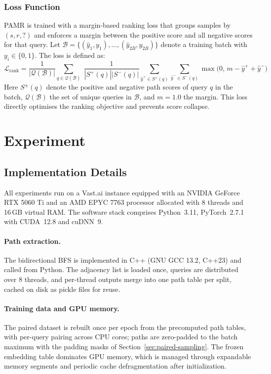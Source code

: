 \documentclass[runningheads]{llncs}
\begin{document}
\subsubsection{Loss Function}
\label{sec:loss-functions}

PAMR is trained with a margin-based ranking loss that groups samples
by $(s, r, ?)$ and enforces a margin between the positive score
and all negative scores for that query. Let $\mathcal{B} = \{(\hat{y}_1, y_1), \ldots, (\hat{y}_{2B}, y_{2B})\}$
denote a training batch with $y_i \in \{0, 1\}$. The loss is defined as:
\begin{equation}
  \mathcal{L}_{\text{rank}} = \frac{1}{|\mathcal{Q}(\mathcal{B})|} \sum_{q \in \mathcal{Q}(\mathcal{B})}\; \frac{1}{|S^+(q)||S^-(q)|} \sum_{\hat{y}^+ \in S^+(q)} \sum_{\hat{y}^- \in S^-(q)}
  \max\bigl(0,\, m - \hat{y}^+ + \hat{y}^-\bigr)
  \label{eq:loss-rank}
\end{equation}
Here $S^{\pm}(q)$ denote the positive and negative path scores of query
$q$ in the batch, $\mathcal{Q}(\mathcal{B})$ the set of unique queries in
$\mathcal{B}$, and $m = 1.0$ the margin. This loss directly optimises the ranking objective and prevents
score collapse.

\section{Experiment}
\label{sec:experiment}
\subsection{Implementation Details}
\label{sec:implementation}

All experiments run on a Vast.ai instance equipped with an NVIDIA
GeForce RTX 5060 Ti and an AMD EPYC 7763 processor allocated with 8 threads
and 16\,GB virtual RAM. The software stack comprises Python~3.11,
PyTorch~2.7.1 with CUDA~12.8 and cuDNN~9.

\paragraph{Path extraction.}
The bidirectional BFS is implemented in C++ (GNU GCC 13.2, C++23) and called
from Python. The adjacency list is loaded once, queries are distributed over 8
threads, and per-thread outputs merge into one path table per split, cached on
disk as pickle files for reuse.

\paragraph{Training data and GPU memory.}
The paired dataset is rebuilt once per epoch from the precomputed path tables,
with per-query pairing across CPU cores; paths are zero-padded to the batch
maximum with the padding masks of Section~\ref{sec:paired-sampling}. The frozen
embedding table dominates GPU memory, which is managed through expandable
memory segments and periodic cache defragmentation after initialization.
\end{document}
